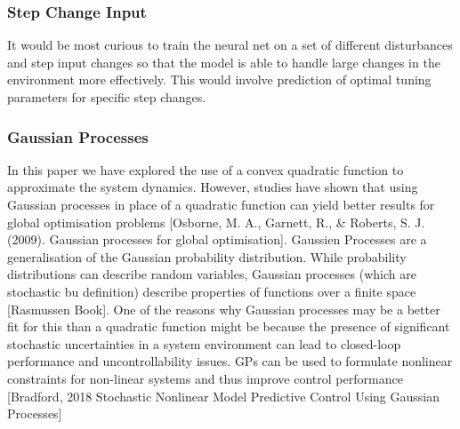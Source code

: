 \documentclass[conference]{IEEEtran}
\theoremstyle{definition}
\begin{document}
\subsubsection{Step Change Input}
It would be most curious to train the neural net on a set of different disturbances and step input changes so that the model is able to handle large changes in the environment more effectively. This would involve prediction of optimal tuning parameters for specific step changes. 
\vspace{3mm}
\subsubsection{Gaussian Processes}
In this paper we have explored the use of a convex quadratic function to approximate the system dynamics. However, studies have shown that using Gaussian processes in place of a quadratic function can yield better results for global optimisation problems [Osborne, M. A., Garnett, R., \& Roberts, S. J. (2009). Gaussian processes for global optimisation]. Gaussien Processes are a generalisation of the Gaussian probability distribution. While probability distributions can describe random variables, Gaussian processes (which are stochastic bu definition) describe properties of functions over a finite space [Rasmussen Book]. One of the reasons why Gaussian processes may be a better fit for this than a quadratic function might be because the presence of significant stochastic uncertainties in a system environment can lead to closed-loop performance and uncontrollability issues. GPs can be used to formulate nonlinear constraints for non-linear systems and thus improve control performance [Bradford, 2018  Stochastic Nonlinear Model Predictive Control Using Gaussian Processes]
\vspace{3mm}
\end{document}
